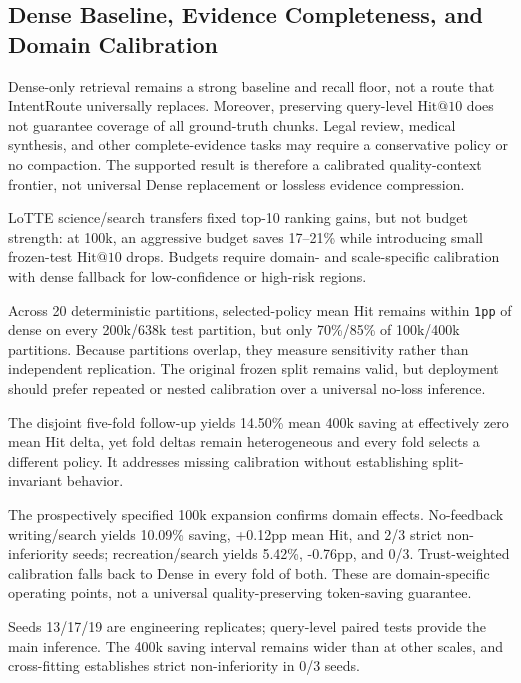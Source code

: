 \subsection{Dense Baseline, Evidence Completeness, and Domain Calibration}
\label{sec:08-limitations:dense-baseline-evidence-completeness-and-domain-calibration}

Dense-only retrieval remains a strong baseline and recall floor, not a route that IntentRoute universally replaces. Moreover, preserving query-level $\mathrm{Hit@10}$ does not guarantee coverage of all ground-truth chunks. Legal review, medical synthesis, and other complete-evidence tasks may require a conservative policy or no compaction. The supported result is therefore a calibrated quality-context frontier, not universal Dense replacement or lossless evidence compression.

LoTTE science/search transfers fixed top-10 ranking gains, but not budget strength: at 100k, an aggressive budget saves 17--21\% while introducing small frozen-test $\mathrm{Hit@10}$ drops. Budgets require domain- and scale-specific calibration with dense fallback for low-confidence or high-risk regions.

Across 20 deterministic partitions, selected-policy mean Hit remains within \nolinkurl{1pp} of dense on every 200k/638k test partition, but only 70\%/85\% of 100k/400k partitions. Because partitions overlap, they measure sensitivity rather than independent replication. The original frozen split remains valid, but deployment should prefer repeated or nested calibration over a universal no-loss inference.

The disjoint five-fold follow-up yields 14.50\% mean 400k saving at effectively zero mean Hit delta, yet fold deltas remain heterogeneous and every fold selects a different policy. It addresses missing calibration without establishing split-invariant behavior.

The prospectively specified 100k expansion confirms domain effects. No-feedback writing/search yields 10.09\% saving, +0.12pp mean Hit, and 2/3 strict non-inferiority seeds; recreation/search yields 5.42\%, -0.76pp, and 0/3. Trust-weighted calibration falls back to Dense in every fold of both. These are domain-specific operating points, not a universal quality-preserving token-saving guarantee.

Seeds 13/17/19 are engineering replicates; query-level paired tests provide the main inference. The 400k saving interval remains wider than at other scales, and cross-fitting establishes strict non-inferiority in 0/3 seeds.

